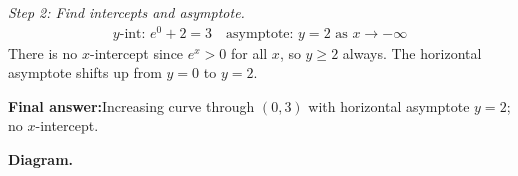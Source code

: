 \documentclass[11pt]{article}
\begin{document}
\textit{Step 2: Find intercepts and asymptote.}
\[\begin{gathered}
y\text{-int: } e^{0} + 2 = 3 \quad \text{asymptote: } y = 2 \text{ as } x \to -\infty
\end{gathered}\]
There is no \( x \)-intercept since \( e^{x} > 0 \) for all \( x \), so \( y \geq 2 \) always. The horizontal asymptote shifts up from \( y = 0 \) to \( y = 2 \).

\begin{answerbox}
\textbf{Final answer:}\quad Increasing curve through \(\displaystyle (0, 3)\) with horizontal asymptote \(\displaystyle  y = 2 \); no \(\displaystyle  x \)-intercept.
\end{answerbox}
\textbf{Diagram.}

\begin{center}
\end{center}
\end{document}

